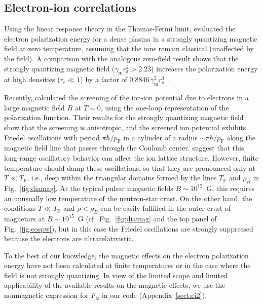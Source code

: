 \documentclass[traditabstract]{aa}
\newcommand{\gammam}{\gamma_\mathrm{m}}
\newcommand{\pF}{p_\mathrm{F}}
\newcommand{\rs}{r_\mathrm{s}}
\newcommand{\TF}{T_\mathrm{F}}
\begin{document}
{%
\subsection{Electron-ion correlations}

Using the linear response theory in the Thomas-Fermi limit,
\citet{Fushiki-ea} evaluated the electron polarization
energy  for a dense plasma in a strongly quantizing magnetic
field at zero temperature, assuming that the ions remain
classical (unaffected by the field). A comparison with the
analogous zero-field result shows that the strongly
quantizing magnetic field ($\gammam \rs^2 > 2.23$)
increases the polarization energy at high densities
($\rs\ll1$) by a factor of $0.8846\,\gammam^2
\rs^4$ \citep{PCS}.

Recently, \citet{SharmaReddy11} calculated the
screening of the ion-ion potential due to electrons in a
large magnetic field $B$ at $T=0$, using the one-loop
representation of the polarization function. Their results
for the strongly quantizing magnetic field show that the
screening is anisotropic, and the screened ion potential
exhibits Friedel oscillations with period $\pi\hbar/\pF$ in
a cylinder of a radius $\sim\pi\hbar/\pF$ along the magnetic
field line that passes through the Coulomb center.
\citeauthor{SharmaReddy11} suggest that this long-range
oscillatory behavior can affect the ion lattice structure.
However, finite temperature should damp these oscillations,
so that they are pronounced only at $T\ll\TF$, i.e., deep
within the triangular domains formed by the lines $\TF$ and
$\rho_B$ in Fig.~\ref{fig:diamag}. At the typical pulsar
magnetic fields $B\sim10^{12}$~G, this requires an unusually
low temperature of the neutron-star crust. On the other
hand, the conditions  $T\ll\TF$ and $\rho<\rho_B$ can be
easily fulfilled in the outer crust of magnetars at
$B\sim10^{15}$~G (cf.~Fig.~\ref{fig:diamag} and the top
panel of Fig.~\ref{fig:eospw}), but in this case the Friedel
oscillations are strongly suppressed because the electrons
are ultrarelativistic.

To the best of our knowledge,
the magnetic effects on the
electron polarization energy have not been calculated
at finite temperatures or in the case where the field is
not strongly quantizing.
In view of the limited scope and limited applicability of
the available results on the magnetic effects, we use the
nonmagnetic expression for $F_\mathrm{ie}$ in our code
(Appendix~\ref{sect:ei2}).

}
\end{document}
